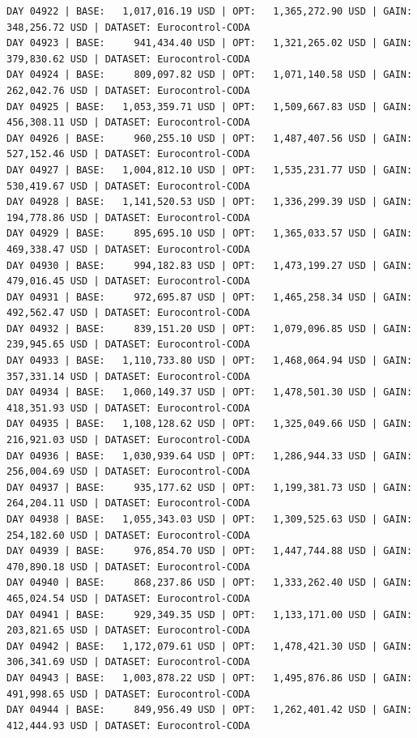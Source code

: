\documentclass[11pt,a4paper]{article}
\begin{document}
\begin{verbatim}
DAY 04922 | BASE:   1,017,016.19 USD | OPT:   1,365,272.90 USD | GAIN: 348,256.72 USD | DATASET: Eurocontrol-CODA
DAY 04923 | BASE:     941,434.40 USD | OPT:   1,321,265.02 USD | GAIN: 379,830.62 USD | DATASET: Eurocontrol-CODA
DAY 04924 | BASE:     809,097.82 USD | OPT:   1,071,140.58 USD | GAIN: 262,042.76 USD | DATASET: Eurocontrol-CODA
DAY 04925 | BASE:   1,053,359.71 USD | OPT:   1,509,667.83 USD | GAIN: 456,308.11 USD | DATASET: Eurocontrol-CODA
DAY 04926 | BASE:     960,255.10 USD | OPT:   1,487,407.56 USD | GAIN: 527,152.46 USD | DATASET: Eurocontrol-CODA
DAY 04927 | BASE:   1,004,812.10 USD | OPT:   1,535,231.77 USD | GAIN: 530,419.67 USD | DATASET: Eurocontrol-CODA
DAY 04928 | BASE:   1,141,520.53 USD | OPT:   1,336,299.39 USD | GAIN: 194,778.86 USD | DATASET: Eurocontrol-CODA
DAY 04929 | BASE:     895,695.10 USD | OPT:   1,365,033.57 USD | GAIN: 469,338.47 USD | DATASET: Eurocontrol-CODA
DAY 04930 | BASE:     994,182.83 USD | OPT:   1,473,199.27 USD | GAIN: 479,016.45 USD | DATASET: Eurocontrol-CODA
DAY 04931 | BASE:     972,695.87 USD | OPT:   1,465,258.34 USD | GAIN: 492,562.47 USD | DATASET: Eurocontrol-CODA
DAY 04932 | BASE:     839,151.20 USD | OPT:   1,079,096.85 USD | GAIN: 239,945.65 USD | DATASET: Eurocontrol-CODA
DAY 04933 | BASE:   1,110,733.80 USD | OPT:   1,468,064.94 USD | GAIN: 357,331.14 USD | DATASET: Eurocontrol-CODA
DAY 04934 | BASE:   1,060,149.37 USD | OPT:   1,478,501.30 USD | GAIN: 418,351.93 USD | DATASET: Eurocontrol-CODA
DAY 04935 | BASE:   1,108,128.62 USD | OPT:   1,325,049.66 USD | GAIN: 216,921.03 USD | DATASET: Eurocontrol-CODA
DAY 04936 | BASE:   1,030,939.64 USD | OPT:   1,286,944.33 USD | GAIN: 256,004.69 USD | DATASET: Eurocontrol-CODA
DAY 04937 | BASE:     935,177.62 USD | OPT:   1,199,381.73 USD | GAIN: 264,204.11 USD | DATASET: Eurocontrol-CODA
DAY 04938 | BASE:   1,055,343.03 USD | OPT:   1,309,525.63 USD | GAIN: 254,182.60 USD | DATASET: Eurocontrol-CODA
DAY 04939 | BASE:     976,854.70 USD | OPT:   1,447,744.88 USD | GAIN: 470,890.18 USD | DATASET: Eurocontrol-CODA
DAY 04940 | BASE:     868,237.86 USD | OPT:   1,333,262.40 USD | GAIN: 465,024.54 USD | DATASET: Eurocontrol-CODA
DAY 04941 | BASE:     929,349.35 USD | OPT:   1,133,171.00 USD | GAIN: 203,821.65 USD | DATASET: Eurocontrol-CODA
DAY 04942 | BASE:   1,172,079.61 USD | OPT:   1,478,421.30 USD | GAIN: 306,341.69 USD | DATASET: Eurocontrol-CODA
DAY 04943 | BASE:   1,003,878.22 USD | OPT:   1,495,876.86 USD | GAIN: 491,998.65 USD | DATASET: Eurocontrol-CODA
DAY 04944 | BASE:     849,956.49 USD | OPT:   1,262,401.42 USD | GAIN: 412,444.93 USD | DATASET: Eurocontrol-CODA

\end{verbatim}
\end{document}
